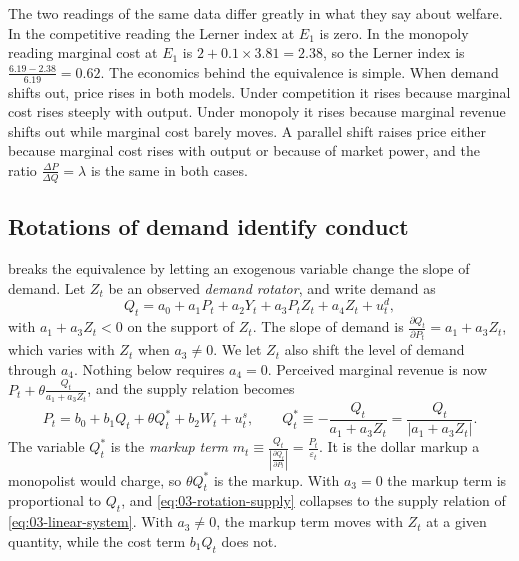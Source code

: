 The two readings of the same data differ greatly in what they say about welfare. In the competitive reading the Lerner
index at $E_1$ is zero. In the monopoly reading marginal cost at $E_1$ is $2 + 0.1 \times 3.81 = 2.38$, so the Lerner
index is $\frac{6.19 - 2.38}{6.19} = 0.62$. The economics behind the equivalence is simple. When demand shifts out, price
rises in both models. Under competition it rises because marginal cost rises steeply with output. Under monopoly it rises
because marginal revenue shifts out while marginal cost barely moves. A parallel shift raises price either because
marginal cost rises with output or because of market power, and the ratio $\frac{\Delta P}{\Delta Q} = \lambda$ is the
same in both cases.

\subsection{Rotations of demand identify conduct}\label{sec:03-rotation}

\citet{Bresnahan1982} breaks the equivalence by letting an exogenous variable change the slope of demand. Let $Z_t$ be an
observed \emph{demand rotator}, and write demand as
\begin{equation}\label{eq:03-rotation-demand}
Q_t = a_0 + a_1 P_t + a_2 Y_t + a_3 P_t Z_t + a_4 Z_t + u^d_t ,
\end{equation}
with $a_1 + a_3 Z_t < 0$ on the support of $Z_t$. The slope of demand is $\frac{\partial Q_t}{\partial P_t} = a_1 + a_3 Z_t$,
which varies with $Z_t$ when $a_3 \neq 0$. We let $Z_t$ also shift the level of demand through $a_4$. Nothing below
requires $a_4 = 0$. Perceived marginal revenue is now $P_t + \theta\frac{Q_t}{a_1 + a_3 Z_t}$, and the supply relation
becomes
\begin{equation}\label{eq:03-rotation-supply}
P_t = b_0 + b_1 Q_t + \theta Q^*_t + b_2 W_t + u^s_t, \qquad
Q^*_t \equiv -\frac{Q_t}{a_1 + a_3 Z_t} = \frac{Q_t}{\lvert a_1 + a_3 Z_t\rvert} .
\end{equation}
The variable $Q^*_t$ is the \emph{markup term} $m_t \equiv \frac{Q_t}{\left\lvert \frac{\partial Q_t}{\partial P_t}\right\rvert} =
\frac{P_t}{\varepsilon_t}$. It is the dollar markup a monopolist would charge, so $\theta Q^*_t$ is the markup. With
$a_3 = 0$ the markup term is proportional to $Q_t$, and \eqref{eq:03-rotation-supply} collapses to the supply relation of
\eqref{eq:03-linear-system}. With $a_3 \neq 0$, the markup term moves with $Z_t$ at a given quantity, while the cost term
$b_1 Q_t$ does not.

